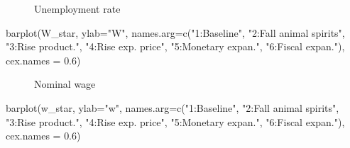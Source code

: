 \documentclass[
  letterpaper,
  DIV=11,
  numbers=noendperiod]{scrreprt}
\newenvironment{Shaded}{\begin{snugshade}}{\end{snugshade}}
\newcommand{\AttributeTok}[1]{\textcolor[rgb]{0.40,0.45,0.13}{#1}}
\newcommand{\FloatTok}[1]{\textcolor[rgb]{0.68,0.00,0.00}{#1}}
\newcommand{\FunctionTok}[1]{\textcolor[rgb]{0.28,0.35,0.67}{#1}}
\newcommand{\NormalTok}[1]{\textcolor[rgb]{0.00,0.23,0.31}{#1}}
\newcommand{\StringTok}[1]{\textcolor[rgb]{0.13,0.47,0.30}{#1}}
\begin{document}
\begin{figure}[H]


\caption{\label{fig-unemployment-neocl-macro}Unemployment rate}

\end{figure}%

\begin{Shaded}
\begin{Highlighting}[]
\FunctionTok{barplot}\NormalTok{(W\_star, }\AttributeTok{ylab=}\StringTok{"W"}\NormalTok{, }\AttributeTok{names.arg=}\FunctionTok{c}\NormalTok{(}\StringTok{"1:Baseline"}\NormalTok{, }\StringTok{"2:Fall animal spirits"}\NormalTok{, }\StringTok{"3:Rise product."}\NormalTok{,}
                                      \StringTok{"4:Rise exp. price"}\NormalTok{, }\StringTok{"5:Monetary expan."}\NormalTok{, }\StringTok{"6:Fiscal expan."}\NormalTok{), }\AttributeTok{cex.names =} \FloatTok{0.6}\NormalTok{)}
\end{Highlighting}
\end{Shaded}

\begin{figure}[H]


\caption{\label{fig-nominal-wage-neocl-macro}Nominal wage}

\end{figure}%

\begin{Shaded}
\begin{Highlighting}[]
\FunctionTok{barplot}\NormalTok{(w\_star, }\AttributeTok{ylab=}\StringTok{"w"}\NormalTok{, }\AttributeTok{names.arg=}\FunctionTok{c}\NormalTok{(}\StringTok{"1:Baseline"}\NormalTok{, }\StringTok{"2:Fall animal spirits"}\NormalTok{, }\StringTok{"3:Rise product."}\NormalTok{,}
                                      \StringTok{"4:Rise exp. price"}\NormalTok{, }\StringTok{"5:Monetary expan."}\NormalTok{, }\StringTok{"6:Fiscal expan."}\NormalTok{), }\AttributeTok{cex.names =} \FloatTok{0.6}\NormalTok{)}
\end{Highlighting}
\end{Shaded}
\end{document}
